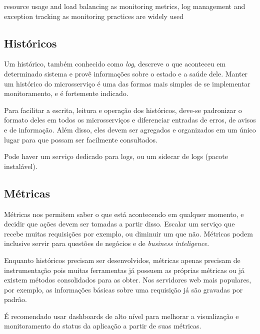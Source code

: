 resource usage and load balancing as monitoring metrics, log management and exception tracking as monitoring practices are widely used \cite{design-monitoring-testing-waseem}

\subsection{Históricos}

Um histórico, também conhecido como \emph{log}, descreve o que aconteceu em determinado sistema e provê informações sobre o estado e a saúde dele. Manter um histórico do microsserviço é uma das formas mais simples de se implementar monitoramento, e é fortemente indicado. 

Para facilitar a escrita, leitura e operação dos históricos, deve-se padronizar o formato deles em todos os microsserviços e diferenciar entradas de erros, de avisos e de informação. Além disso, eles devem ser agregados e organizados em um único lugar para que possam ser facilmente consultados.

Pode haver um serviço dedicado para logs, ou um sidecar de logs (pacote instalável).



\subsection{Métricas}
Métricas nos permitem saber o que está acontecendo em qualquer momento, e decidir que ações devem ser tomadas a partir disso. Escalar um serviço que recebe muitas requisições por exemplo, ou diminuir um que não. Métricas podem inclusive servir para questões de negócios e de \emph{business inteligence}. 

Enquanto históricos precisam ser desenvolvidos, métricas apenas precisam de instrumentação pois muitas ferramentas já possuem as próprias métricas ou já existem métodos consolidados para as obter. Nos servidores web mais populares, por exemplo, as informações básicas sobre uma requisição já são gravadas por padrão.

É recomendado usar dashboards de alto nível para melhorar a visualização e monitoramento do status da aplicação a partir de suas métricas.

